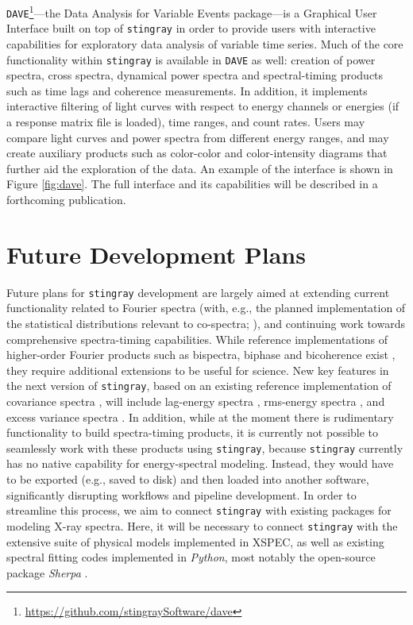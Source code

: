 \documentclass[twocolumn]{aastex62}
\newcommand{\stingray}{\texttt{stingray}\xspace}
\newcommand{\dave}{\texttt{DAVE}\xspace}
\begin{document}
\dave\footnote{\url{https://github.com/stingraySoftware/dave}}---the Data Analysis for Variable Events package---is a Graphical User Interface built on top of \stingray in order to provide users with interactive capabilities for exploratory data analysis of variable time series. 
Much of the core functionality within \stingray is available in \dave as well: creation of power spectra, cross spectra, dynamical power spectra and spectral-timing products such as time lags and coherence measurements. 
In addition, it implements interactive filtering of light curves with respect to energy channels or energies (if a response matrix file is loaded), time ranges, and count rates. 
Users may compare light curves and power spectra from different energy ranges, and may create auxiliary products such as color-color and color-intensity diagrams that further aid the exploration of the data. 
An example of the interface is shown in Figure \ref{fig:dave}. 
The full interface and its capabilities will be described in a forthcoming publication. 



\section{Future Development Plans}
\label{sec:future}

Future plans for \stingray development are largely aimed at extending current functionality related to Fourier spectra (with, e.g., the planned implementation of the statistical distributions relevant to co-spectra; \citealt{huppenkothen2017}), and continuing work towards comprehensive spectra-timing capabilities. 
While reference implementations of higher-order Fourier products such as bispectra, biphase and bicoherence exist \citep{maccarone2002,maccarone2005,maccarone2013}, they require additional extensions to be useful for science. 
New key features in the next version of \stingray, based on an existing reference implementation of covariance spectra \citep{WilkinsonUttley09}, will include lag-energy spectra \citep{Vaughanetal94}, rms-energy spectra \citep{Revnivtsevetal99}, and excess variance spectra \citep{Vaughanetal03}. 
In addition, while at the moment there is rudimentary functionality to build spectra-timing products, it is currently not possible to seamlessly work with these products using \stingray, because \stingray currently has no native capability for energy-spectral modeling. 
Instead, they would have to be exported (e.g., saved to disk) and then loaded into another software, significantly disrupting workflows and pipeline development. 
In order to streamline this process, we aim to connect \stingray with existing packages for modeling X-ray spectra. 
Here, it will be necessary to connect \stingray with the extensive suite of physical models implemented in XSPEC, as well as existing spectral fitting codes implemented in \textit{Python}, most notably the open-source package \textit{Sherpa} \citep{sherpa}.
\end{document}
